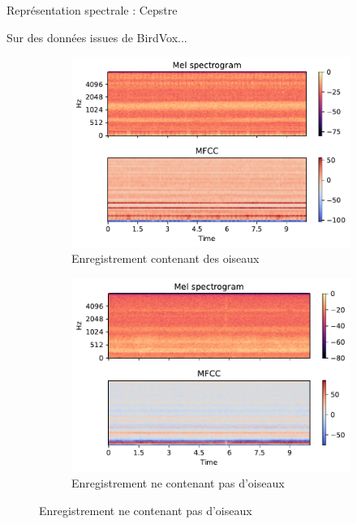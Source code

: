\documentclass[compress,xcolor=table]{beamer}
\begin{document}
\begin{frame}{Représentation spectrale : Cepstre}

    Sur des données issues de BirdVox...

    \begin{figure}[ht]
        \centering
        \begin{subfigure}[b]{0.45\textwidth}
            \centering
            \includegraphics[width=\textwidth]{images/audio/birds.mfcc.birdvox.pdf}
            \caption{Enregistrement contenant des oiseaux}
            \label{fig:birds.mfcc.birdvox}
        \end{subfigure}
        \hfill
        \begin{subfigure}[b]{0.45\textwidth}
            \centering
            \includegraphics[width=\textwidth]{images/audio/nobirds.mfcc.birdvox.pdf}
            \caption{Enregistrement ne contenant pas d'oiseaux}
            \label{fig:nobirds.mfcc.birdvox}
        \end{subfigure}
    \end{figure}

\end{frame}
\end{document}
